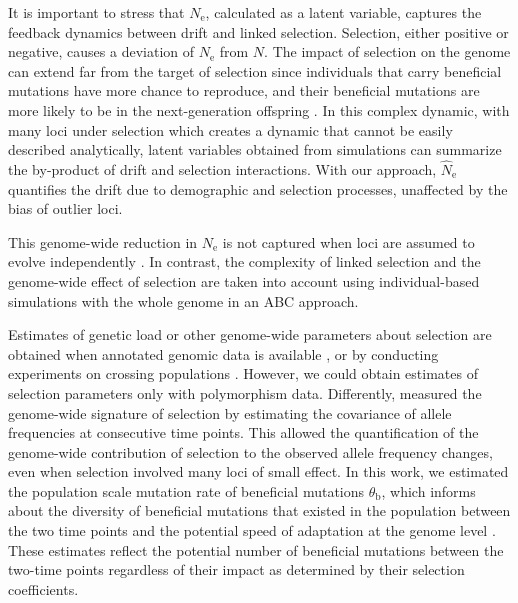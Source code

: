 \documentclass[a4paper, 12pt]{article}
\begin{document}
It is important to stress that $N_{\mathrm{e}}$, calculated as a latent variable, captures the feedback dynamics between drift and linked selection. Selection, either positive or negative, causes a deviation of $N_\mathrm{e}$ from $N$. The impact of selection on the genome can extend far from the target of selection since individuals that carry beneficial mutations have more chance to reproduce, and their beneficial mutations are more likely to be in the next-generation offspring  \citep{Walsh:2018tv}. In this complex dynamic, with many loci under selection which creates a dynamic that cannot be easily described analytically, latent variables obtained from simulations can summarize the by-product of drift and selection interactions. With our approach, $\hat N_\mathrm{e}$ quantifies the drift due to demographic and selection processes, unaffected by the bias of outlier loci.

This genome-wide reduction in $N_{\mathrm{e}}$ is not captured when loci are assumed to evolve independently \citep[as in][for example]{Sheehan:2016caa, Laval:2019jo}. In contrast, the complexity of linked selection and the genome-wide effect of selection are taken into account using individual-based simulations with the whole genome in an ABC approach. 

Estimates of genetic load or other genome-wide parameters about selection are obtained when annotated genomic data is available \citep{Henn:2015ce}, or by conducting experiments on crossing populations \citep[for the genetic load;][]{Plough:2016gw}. However, we could obtain estimates of selection parameters only with polymorphism data. Differently, \citet{Buffalo:2020hq} measured the genome-wide signature of selection by estimating the covariance of allele frequencies at consecutive time points. This allowed the quantification of the genome-wide contribution of selection to the observed allele frequency changes, even when selection involved many loci of small effect. In this work, we estimated the population scale mutation rate of beneficial mutations $\theta_{\mathrm{b}}$, which informs about the diversity of beneficial mutations that existed in the population between the two time points and the potential speed of adaptation at the genome level \citep{Hermisson:2017hw}. These estimates reflect the potential number of beneficial mutations between the two-time points regardless of their impact as determined by their selection coefficients.
\end{document}
